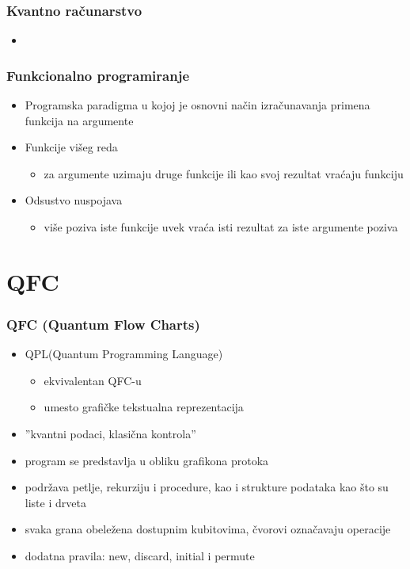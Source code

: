 \documentclass{beamer}
\begin{document}

\begin{frame}
\frametitle{Kvantno računarstvo}
\begin{itemize}
\item 
\end{itemize}
\end{frame}


\begin{frame}
\frametitle{Funkcionalno programiranje}
\begin{itemize}
\item{Programska paradigma u kojoj je osnovni način izračunavanja primena funkcija na argumente}
\item{Funkcije višeg reda}
    \begin{itemize}
    \item{za argumente uzimaju druge funkcije ili kao svoj rezultat vraćaju funkciju }
    \end{itemize}
\item{Odsustvo nuspojava}
  	\begin{itemize}
	\item{više poziva iste funkcije uvek vraća isti rezultat za iste argumente poziva}
  	\end{itemize}
\end{itemize}

\end{frame}

\section{QFC}

\begin{frame}
\frametitle{QFC (Quantum Flow Charts)}
\begin{itemize}
\item{QPL(Quantum Programming Language)}
	\begin{itemize}
	\item{ekvivalentan QFC-u}
    \item{umesto grafičke tekstualna reprezentacija}
	\end{itemize}
\item{''kvantni podaci, klasična kontrola''}\cite{p1}
\item{program se predstavlja u obliku grafikona protoka}
\item{podržava petlje, rekurziju i procedure, kao i strukture podataka kao što su liste i drveta}
\item{svaka grana obeležena dostupnim kubitovima, čvorovi označavaju operacije}
\item{dodatna pravila: new, discard, initial i permute}
\end{itemize}
\end{frame}
\end{document}
